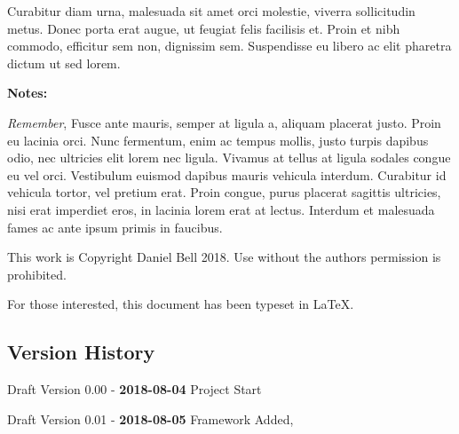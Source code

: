 \documentclass[8pt]{article}
\begin{document}
Curabitur diam urna, malesuada sit amet orci molestie, viverra sollicitudin metus. Donec porta erat augue, ut feugiat felis facilisis et. Proin et nibh commodo, efficitur sem non, dignissim sem. Suspendisse eu libero ac elit pharetra dictum ut sed lorem. 




\begin{mdframed}
\noindent \textbf{Notes:}
	
\textit{Remember}, Fusce ante mauris, semper at ligula a, aliquam placerat justo. Proin eu lacinia orci. Nunc fermentum, enim ac tempus mollis, justo turpis dapibus odio, nec ultricies elit lorem nec ligula. Vivamus at tellus at ligula sodales congue eu vel orci. Vestibulum euismod dapibus mauris vehicula interdum. Curabitur id vehicula tortor, vel pretium erat. Proin congue, purus placerat sagittis ultricies, nisi erat imperdiet eros, in lacinia lorem erat at lectus. Interdum et malesuada fames ac ante ipsum primis in faucibus.

\end{mdframed} 


\begin{center}
	\small
	This work is Copyright \textcopyright \hspace{1pt} Daniel Bell 2018. Use without the authors permission is prohibited. 
\end{center}




\vspace{100pt} 
\noindent For those interested, this document has been typeset in \LaTeX.

\subsection{Version History}

\noindent Draft Version 0.00 - \textbf{2018-08-04} Project Start

\noindent Draft Version 0.01 - \textbf{2018-08-05} Framework Added, 


\vspace{20pt}
%
%






%
%
%
\end{document}
